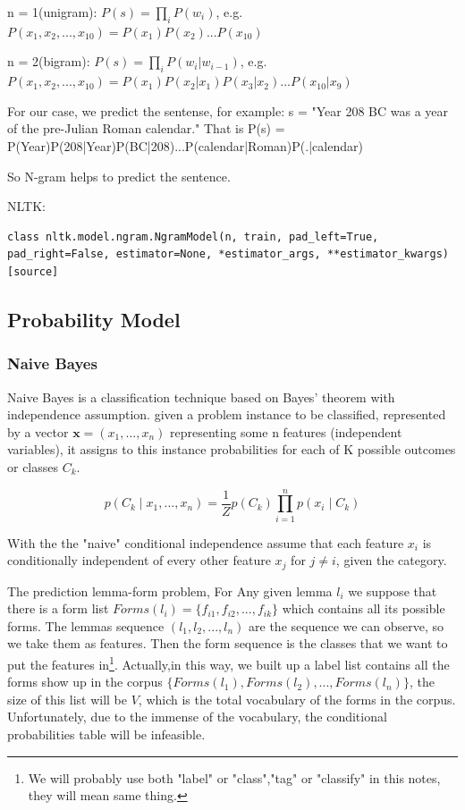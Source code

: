 \documentclass[a4paper]{article}
\begin{document}
n = 1(unigram): $P(s)=\prod\limits_{i}P(w_i)$, e.g. $P(x_1,x_2,...,x_{10}) = P(x_1)P(x_2)...P(x_{10})$

n = 2(bigram): $P(s)=\prod\limits_{i}P(w_i|w_{i-1})$, e.g. $P(x_1,x_2,...,x_{10}) = P(x_1)P(x_2|x_1)P(x_3|x_2)...P(x_{10}|x_9)$

For our case, we predict the sentense, for example: 
s = "Year 208 BC was a year of the pre-Julian Roman calendar." 
That is P(s) = P(Year)P(208|Year)P(BC|208)...P(calendar|Roman)P(.|calendar)

So N-gram helps to predict the sentence.

NLTK:
\begin{lstlisting}
class nltk.model.ngram.NgramModel(n, train, pad_left=True, pad_right=False, estimator=None, *estimator_args, **estimator_kwargs)[source]
\end{lstlisting}

\subsection{Probability Model}
\subsubsection{Naive Bayes}
Naive Bayes is a classification technique based on Bayes' theorem with independence assumption.  given a problem instance to be classified, represented by a vector ${\mathbf  {x}}=(x_{1},\dots ,x_{n})$ representing some n features (independent variables), it assigns to this instance probabilities for each of K possible outcomes or classes $C_{k}$. \cite{murty_pattern_2011}

\[p(C_{k}\mid x_{1},\dots ,x_{n})={\frac {1}{Z}}p(C_{k})\prod _{i=1}^{n}p(x_{i}\mid C_{k})\]

With the the "naive" conditional independence assume that each feature $x_{i}$ is conditionally independent of every other feature $x_{j}$ for $j \neq i$, given the category. 

The prediction lemma-form problem, For Any given lemma $l_i$ we suppose that there is a form list $Forms(l_i)=\{f_{i1},f_{i2},...,f_{ik}\}$ which contains all its possible forms. The lemmas sequence $(l_1,l_2,...,l_n)$ are the sequence we can observe, so we take them as features. Then the form sequence is the classes that we want to put the features in\footnote{We will probably use both "label" or "class","tag" or "classify" in this notes, they will mean same thing.}. Actually,in this way,  we built up a label list contains all the forms show up in the corpus $\{Forms(l_1),Forms(l_2),..., Forms(l_n)\}$, the size of this list will be $V$, which is the total vocabulary of the forms in the corpus. Unfortunately, due to the immense of the vocabulary, the conditional probabilities table will be infeasible.
\end{document}

